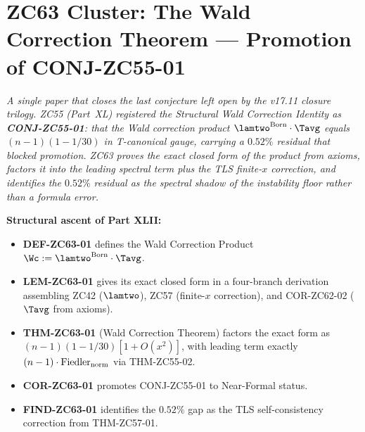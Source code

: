 \documentclass[12pt, a4paper]{article}
\begin{document}
\clearpage

\part{ZC63 Cluster: The Wald Correction Theorem ---
      Promotion of CONJ-ZC55-01}
\label{part:zc63}

\noindent
\textit{A single paper that closes the last conjecture left open by the
v17.11 closure trilogy. ZC55 (Part~XL) registered the Structural Wald
Correction Identity as \textbf{CONJ-ZC55-01}: that the Wald correction
product $\lamtwo^{\rm Born}\cdot\Tavg$ equals $(n-1)(1-1/30)$ in
T-canonical gauge, carrying a $0.52\%$ residual that blocked promotion.
ZC63 proves the \emph{exact} closed form of the product from axioms,
factors it into the leading spectral term plus the TLS finite-$x$
correction, and identifies the $0.52\%$ residual as the spectral shadow
of the instability floor rather than a formula error.}

\medskip
\textbf{Structural ascent of Part XLII:}
\begin{itemize}[leftmargin=1.5em]
\item \textbf{DEF-ZC63-01} defines the Wald Correction Product
  $\Wc := \lamtwo^{\rm Born}\cdot\Tavg$.
\item \textbf{LEM-ZC63-01} gives its exact closed form in a four-branch
  derivation assembling ZC42 ($\lamtwo$), ZC57 (finite-$x$ correction),
  and COR-ZC62-02 ($\Tavg$ from axioms).
\item \textbf{THM-ZC63-01} (Wald Correction Theorem) factors the exact
  form as $(n-1)(1-1/30)[1+O(x^2)]$, with leading term exactly
  $(n-1)\cdot\mathrm{Fiedler}_{\rm norm}$ via THM-ZC55-02.
\item \textbf{COR-ZC63-01} promotes CONJ-ZC55-01 to Near-Formal status.
\item \textbf{FIND-ZC63-01} identifies the $0.52\%$ gap as the TLS
  self-consistency correction from THM-ZC57-01.
\end{itemize}
\end{document}
